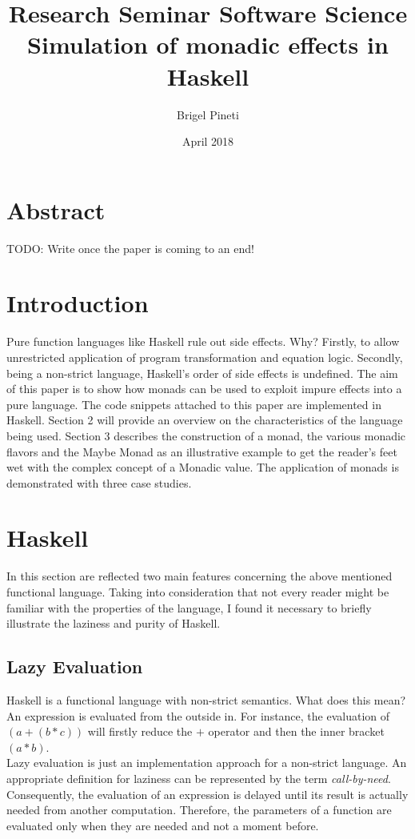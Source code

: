 \documentclass[a4paper, onecolumn]{article}
\title{\Large{Research Seminar Software Science} \\
\huge{Simulation of monadic effects in Haskell}}
\author{Brigel Pineti}
\date{April 2018}
\begin{document}
\maketitle

\section*{Abstract}

TODO: Write once the paper is coming to an end!

\section{Introduction}

Pure function languages like Haskell rule out side effects. Why? Firstly, to allow unrestricted application of program transformation and equation logic. Secondly, being a non-strict language, Haskell's order of side effects is undefined. The aim of this paper is to show how monads can be used to exploit impure effects into a pure language. The code snippets attached to this paper are implemented in Haskell. Section 2 will provide an overview on the characteristics of the language being used. Section 3 describes the construction of a monad, the various monadic flavors and the Maybe Monad as an illustrative example to get the reader's feet wet with the complex concept of a Monadic value. The application of monads is demonstrated with three case studies.

\section{Haskell}

In this section are reflected two main features concerning the above mentioned functional language. Taking into consideration that not every reader might be familiar with the properties of the language, I found it necessary to briefly illustrate the laziness and purity of Haskell.  

\subsection{Lazy Evaluation}

Haskell is a functional language with non-strict semantics. What does this mean? An expression is evaluated from the outside in. For instance, the evaluation of \textit{$(a + (b * c))$} will firstly reduce the \textit{$+$} operator and then the inner bracket \textit{$(a * b)$}. \\
Lazy evaluation is just an implementation approach for a non-strict language. An appropriate definition for laziness can be represented by the term \textit{call-by-need}. Consequently, the evaluation of an expression is delayed until its result is actually needed from another computation. Therefore, the parameters of a function are evaluated only when they are needed and not a moment before.
\end{document}
